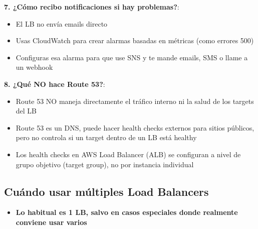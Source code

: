 \documentclass[12pt,a4paper]{report}
\newcommand{\important}[1]{\textcolor{dangerred}{\textbf{#1}}}
\begin{document}
\textbf{7. ¿Cómo recibo notificaciones si hay problemas?}:
\begin{itemize}
    \item El LB no envía emails directo
    \item Usas CloudWatch para crear alarmas basadas en métricas (como errores 500)
    \item Configuras esa alarma para que use SNS y te mande emails, SMS o llame a un webhook
\end{itemize}

\textbf{8. ¿Qué NO hace Route 53?}:
\begin{itemize}
    \item Route 53 NO maneja directamente el tráfico interno ni la salud de los targets del LB
    \item Route 53 es un DNS, puede hacer health checks externos para sitios públicos, pero no controla si un target dentro de un LB está healthy
    \item Los health checks en AWS Load Balancer (ALB) se configuran a nivel de grupo objetivo (target group), no por instancia individual
\end{itemize}

\subsection{Cuándo usar múltiples Load Balancers}

\begin{itemize}
    \item \important{Lo habitual es 1 LB, salvo en casos especiales donde realmente conviene usar varios}
\end{itemize}
\end{document}
